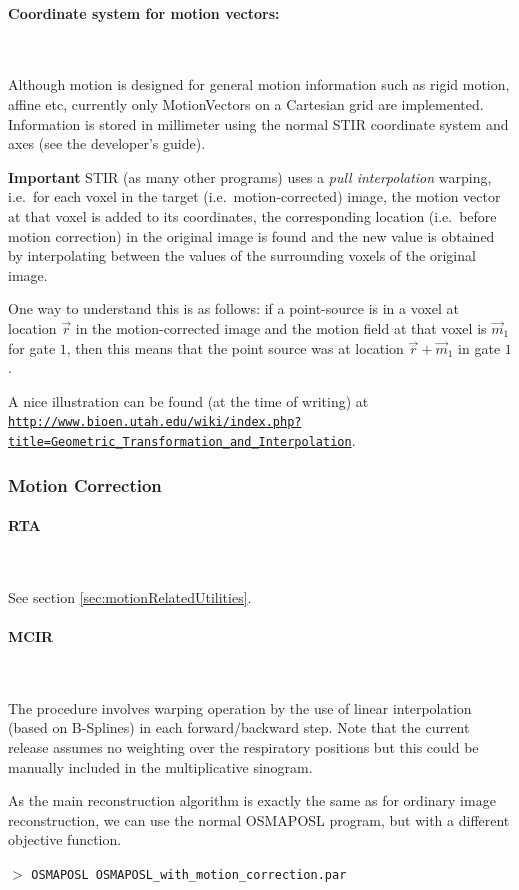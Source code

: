 \documentclass{article}
\def\url#1#2{\mbox{\href{#1}{\tt #2}}}
\newcommand{\subsubsubsection}[1]{\paragraph{#1}\mbox{} \\}
\newcommand{\cmdline}[1]{\par \noindent $>$ \texttt{#1}\par}
\begin{document}
{\subsubsubsection{Coordinate system for motion vectors: }}

Although motion is designed for general motion
information such as rigid motion, affine etc, currently only MotionVectors on a
Cartesian grid are implemented. Information is stored in millimeter using the normal
STIR coordinate system and axes (see the developer's guide).

\textbf{Important} STIR (as many other programs) uses a 
\textit{pull interpolation} warping, i.e.\ for each voxel in the target
(i.e.\ motion-corrected) image, the motion vector
at that voxel is added to its coordinates, the corresponding location (i.e.\ before motion correction)
in the original image is found and the new value is obtained by interpolating 
between the values of the surrounding voxels of the original image.

One way to understand this is as follows: if a point-source is in a voxel at location $\vec r$ in the motion-corrected image
and the motion field at that voxel is $\vec m_1$ for gate $1$, then this means that the point source
was at location $\vec r + \vec m_1$ in gate $1$.

A nice illustration can be found (at the time of writing) at\\ 
{ \small
\url{http://www.bioen.utah.edu/wiki/index.php?title=Geometric_Transformation_and_Interpolation}{http://www.bioen.utah.edu/wiki/index.php?title=Geometric\_Transformation\_and\_Interpolation}}.

\subsubsection{Motion Correction}

{ \subsubsubsection{RTA}
}
See section \ref{sec:motionRelatedUtilities}.

{ \subsubsubsection{MCIR}
}

The procedure involves warping operation by the use of linear interpolation (based
on B-Splines) in each forward/backward step. Note that the current release
assumes no weighting over the respiratory positions but this could be manually
included in the multiplicative sinogram.

As the main reconstruction algorithm is exactly the same as for ordinary image
reconstruction, we can use the normal OSMAPOSL program, but with a different
objective function. 

\cmdline{OSMAPOSL OSMAPOSL\_with\_motion\_correction.par}
\end{document}
